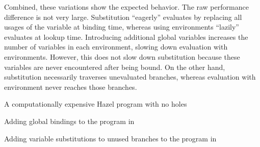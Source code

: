 Combined, these variations show the expected behavior. The raw performance difference is not very large. Substitution ``eagerly'' evaluates by replacing all usages of the variable at binding time, whereas using environments ``lazily'' evaluates at lookup time. Introducing additional global variables increases the number of variables in each environment, slowing down evaluation with environments. However, this does not slow down substitution because these variables are never encountered after being bound. On the other hand, substitution necessarily traverses unevaluated branches, whereas evaluation with environment never reaches those branches.

\begin{listing}
  \caption{A computationally expensive Hazel program with no holes}
  \label{fig:perf-fib}
\end{listing}

\begin{listing}
  \caption{Adding global bindings to the program in }
  \label{fig:perf-fib-more-bindings}
\end{listing}

\begin{listing}
  \caption{Adding variable substitutions to unused branches to the program in }
  \label{fig:perf-fib-more-branches}
\end{listing}

